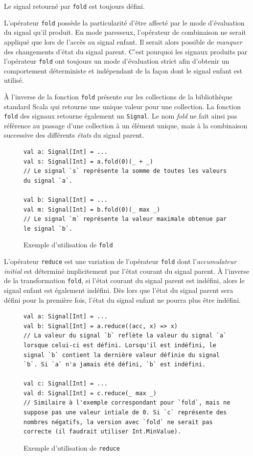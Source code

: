 Le signal retourné par \texttt{fold} est toujours défini.

L'opérateur \texttt{fold} possède la particularité d'être affecté par le mode d'évaluation du signal qu'il produit. En mode paresseux, l'opérateur de combinaison ne serait appliqué que lors de l'accès au signal enfant. Il serait alors possible de \emph{manquer} des changements d'état du signal parent. C'est pourquoi les signaux produits par l'opérateur \texttt{fold} ont toujours un mode d'évaluation strict afin d'obtenir un comportement déterministe et indépendant de la façon dont le signal enfant est utilisé.

À l'inverse de la fonction \texttt{fold} présente sur les collections de la bibliothèque standard Scala qui retourne une unique valeur pour une collection. La fonction \texttt{fold} des signaux retourne également un \texttt{Signal}. Le nom \emph{fold} ne fait ainsi pas référence au passage d'une collection à un élément unique, mais à la combinaison successive des différents \emph{états} du signal parent.

\begin{figure}[h]
	\begin{lstlisting}
val a: Signal[Int] = ...
val s: Signal[Int] = a.fold(0)(_ + _)
// Le signal `s` représente la somme de toutes les valeurs du signal `a`.

val b: Signal[Int] = ...
val m: Signal[Int] = b.fold(0)(_ max _)
// Le signal `m` représente la valeur maximale obtenue par le signal `b`.
	\end{lstlisting}
	\caption{Exemple d'utilisation de \texttt{fold}}
\end{figure}

L'opérateur \texttt{reduce} est une variation de l'opérateur \texttt{fold} dont l'\emph{accumulateur initial} est déterminé implicitement par l'état courant du signal parent. À l'inverse de la transformation \texttt{fold}, si l'état courant du signal parent est indéfini, alors le signal enfant est également indéfini. Dès lors que l'état du signal parent sera défini pour la première fois, l'état du signal enfant ne pourra plus être indéfini.

\begin{figure}[h]
	\begin{lstlisting}
val a: Signal[Int] = ...
val b: Signal[Int] = a.reduce((acc, x) => x)
// La valeur du signal `b` reflète la valeur du signal `a` lorsque celui-ci est défini. Lorsqu'il est indéfini, le signal `b` contient la dernière valeur définie du signal `b`. Si `a` n'a jamais été défini, `b` est indéfini.

val c: Signal[Int] = ...
val d: Signal[Int] = c.reduce(_ max _)
// Similaire à l'exemple correspondant pour `fold`, mais ne suppose pas une valeur intiale de 0. Si `c` représente des nombres négatifs, la version avec `fold` ne serait pas correcte (il faudrait utiliser Int.MinValue).
	\end{lstlisting}
	\caption{Exemple d'utilisation de \texttt{reduce}}
\end{figure}

